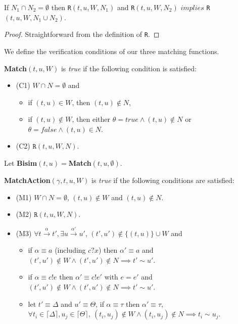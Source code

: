 \documentclass[a4paper,UKenglish,cleveref, autoref]{lipics-v2019}
\begin{document}
\begin{lemma}\label{lem:n_merge}
If $N_1\cap N_2=\emptyset$ then \texttt{R}$(t,u,W,N_1)$ and \texttt{R}$(t,u,W,N_2)$ $implies$ \texttt{R}$(t,u,W,N_1\cup N_2)$.
\end{lemma}
\begin{proof}
Straightforward from the definition of \texttt{R}.
\end{proof}

We define the verification conditions of our three matching functions.
\begin{definition}\label{def:match}
\textbf{Match}$(t,u,W)$ is \textit{true} if the following condition is satisfied:
\begin{itemize}
    \item(C1) $W\cap N=\emptyset$ and
    \begin{itemize}
        \item if $(t,u)\in W$, then $(t,u)\notin N$,
        \item if $(t,u)\notin W$, then either $\theta=true\wedge(t,u)\notin N$ or $\theta=false\wedge(t,u)\in N$.
    \end{itemize}
    \item(C2) $\texttt{R}(t,u,W,N)$.
\end{itemize}
Let \textbf{Bisim}$(t,u)=$\textbf{Match}$(t,u,\emptyset)$.
\end{definition}

\begin{definition}\label{def:matchaction}
\textbf{MatchAction}$(\gamma,t,u,W)$ is \textit{true} if the following conditions are satisfied:
\begin{itemize}
    \item(M1) $W\cap N=\emptyset$, $(t,u)\notin W$ and $(t,u)\notin N$.
    \item(M2) $\texttt{R}(t,u,W,N)$.
    \item(M3) $\forall t\xrightarrow{\alpha}t', \exists u\xrightarrow{\alpha'}u'$, $(t',u')\notin \{(t,u)\}\cup W$ and 
    \begin{itemize}
        \item if $\alpha\equiv a$ (including $c?x$) then $\alpha'\equiv a$ and $(t',u')\notin W\wedge(t',u')\notin N\implies t'\sim u'$.
        \item if $\alpha\equiv c!e$ then $\alpha'\equiv c!e'$ with $e=e'$ and $(t',u')\notin W\wedge(t',u')\notin N\implies t'\sim u'$.
        \item let $t'\equiv \Delta$ and $u'\equiv \Theta$, if $\alpha\equiv \tau$ then $\alpha'\equiv \tau$, $\forall t_i\in \lceil\Delta\rceil, u_j\in \lceil\Theta\rceil,\ (t_i,u_j)\notin W\wedge(t_i,u_j)\notin N\implies t_i\sim u_j$.
    \end{itemize}
\end{itemize}
\end{definition}
\end{document}
